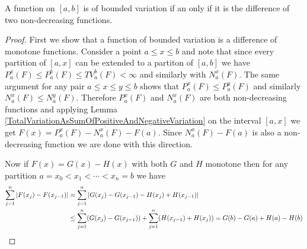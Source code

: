 \begin{thm}\label{BoundedVariationAsDifferenceOfMonotone}A function on $[a,b]$ is of bounded variation if an only if
  it is the difference of two non-decreasing functions.
\end{thm}
\begin{proof}
First we show that a function of bounded variation is a difference of
monotone functions.  Consider a point $a \leq x \leq b$ and note that since every partition
of $[a,x]$ can be extended to a partiton of $[a,b]$ we have $P_a^x(F)
\leq P_a^b(F) \leq TV_a^b(F) < \infty$ and similarly with $N_a^x(F)$.
The same argument for any pair $a \leq x \leq y \leq b$ shows that
$P_a^x(F) \leq P_a^y(F)$ and similarly $N_a^x(F) \leq N_a^y(F)$.
Therefore $P_a^x(F)$ and $N_a^x(F)$ are both non-decreasing functions
and applying Lemma
\ref{TotalVariationAsSumOfPositiveAndNegativeVariation} on the
interval $[a,x]$ we get $F(x) = P_a^x(F) - N_a^x(F) - F(a)$.  Since
$N_a^x(F) - F(a)$ is also a non-decreasing function we are done with
this direction.

Now if $F(x) = G(x) - H(x)$ with both $G$ and $H$ monotone then for
any partition $a=x_0 < x_1 < \dotsb < x_n=b$ we have
\begin{align*}
\sum_{j=1}^n \left \vert F(x_j) - F(x_{j-1}) \right \vert &= \sum_{j=1}^n \left \vert G(x_j) -
  G(x_{j-1}) - H(x_j) + H(x_{j-1}) \right \vert \\
&\leq \sum_{j=1}^n (G(x_j) -
  G(x_{j-1})) + \sum_{j=1}^n( H(x_{j-1}) + H(x_{j})) = G(b) - G(a) +
  H(a) - H(b)
\end{align*}
\end{proof}

